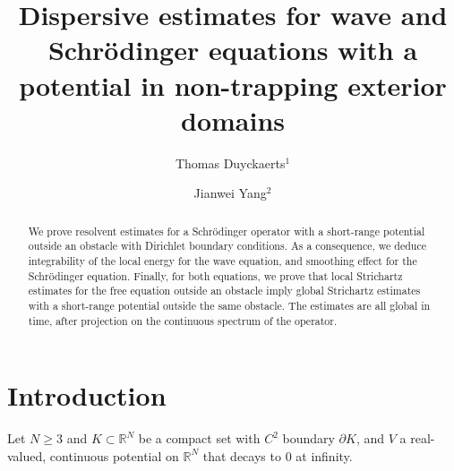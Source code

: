 \documentclass[10pt,leqno]{amsart}
\title[Dispersive estimates with potential in exterior domains]{Dispersive estimates for wave and Schr\"odinger equations with a potential in non-trapping exterior domains}
\author{Thomas Duyckaerts${}^1$}
\author{Jianwei Yang${}^2$}
\theoremstyle{definition}%
\theoremstyle{remark}
\numberwithin{equation}{section}
\newcommand{\R}{\mathbb{R}}
\renewcommand{\^}{\widehat}%
\begin{document}
\begin{abstract}
 We prove resolvent estimates for a Schr\"odinger operator with a short-range potential outside an obstacle with Dirichlet boundary conditions. As a consequence, we deduce integrability of the local energy for the wave equation, and smoothing effect for the Schr\"odinger equation. Finally, for both equations, we prove that local Strichartz estimates for the free equation outside an obstacle imply global Strichartz estimates with a short-range potential outside the same obstacle. The estimates are all global in time, after projection on the continuous spectrum of the operator.
\end{abstract}

\maketitle

\section{Introduction}

Let $N\ge 3$ and $K\subset\R^N$ be a compact set with $C^2$ boundary $\partial K$, and $V$ a real-valued, continuous potential on $\R^N$ that decays to $0$ at infinity. 
\end{document}
